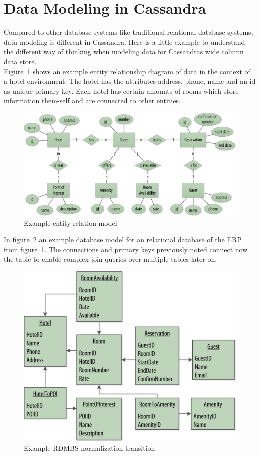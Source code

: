 \section{Data Modeling in Cassandra}  %

Compared to other database systems like traditional relational database systems, data modeling is different in Cassandra. Here is a little example to understand the different way of thinking when modeling data for Cassandras wide column data store. \\

Figure~\ref{fig:cassandra:model_data0} shows an example entity relationship diagram of data in the context of a hotel environment. The hotel has the attributes address, phone, name and an id as unique primary key. Each hotel has certain amounts of rooms which store information them-self and are connected to other entities.

\begin{figure}[H]
    \centering
    \includegraphics[width=0.75\columnwidth]{img/model_example_entity_relation_step0.png}
    \caption{Example entity relation model \autocite{cassandra_oreilly}}
    \label{fig:cassandra:model_data0}
\end{figure}

In figure~\ref{fig:cassandra:model_data1} an example database model for an relational database of the ERP from figure~\ref{fig:cassandra:model_data0}.
The connections and primary keys previously noted connect now the table to enable complex join queries over multiple tables later on.

\begin{figure}[H]
    \centering
    \includegraphics[width=0.75\columnwidth]{img/model_example_rdbms_step1.png}
    \caption{Example RDMBS normalization transition \autocite{cassandra_oreilly}}
    \label{fig:cassandra:model_data1}
\end{figure}


